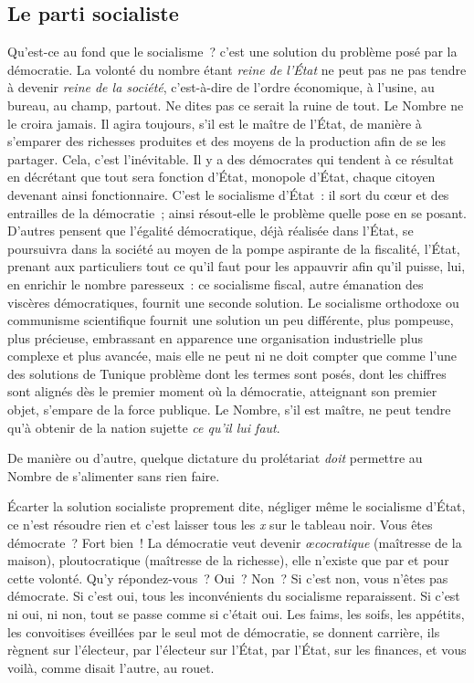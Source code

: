 \documentclass[french,twoside]{book} %
\begin{document}
\subsection[{Le parti socialiste}]{Le parti socialiste}
\noindent Qu’est-ce au fond que le socialisme ? c’est une solution du problème posé par la démocratie. La volonté du nombre étant \emph{reine de l’État} ne peut pas ne pas tendre à devenir \emph{reine de la société}, c’est-à-dire de l’ordre économique, à l’usine, au bureau, au champ, partout. Ne dites pas ce serait la ruine de tout. Le Nombre ne le croira jamais. Il agira toujours, s’il est le maître de l’État, de manière à s’emparer des richesses produites et des moyens de la production afin de se les partager. Cela, c’est l’inévitable. Il y a des démocrates qui tendent à ce résultat en décrétant que tout sera fonction d’État, monopole d’État, chaque citoyen devenant ainsi fonctionnaire. C’est le socialisme d’État : il sort du cœur et des entrailles de la démocratie ; ainsi résout-elle le problème quelle pose en se posant. D’autres pensent que l’égalité démocratique, déjà réalisée dans l’État, se poursuivra dans la société au moyen de la pompe aspirante de la fiscalité, l’État, prenant aux particuliers tout ce qu’il faut pour les appauvrir afin qu’il puisse, lui, en enrichir le nombre paresseux : ce socialisme fiscal, autre émanation des viscères démocratiques, fournit une seconde solution. Le socialisme orthodoxe ou communisme scientifique fournit une solution un peu différente, plus pompeuse, plus précieuse, embrassant en apparence une organisation industrielle plus complexe et plus avancée, mais elle ne peut ni ne doit compter que comme l’une des solutions de Tunique problème dont les termes sont posés, dont les chiffres sont alignés dès le premier moment où la démocratie, atteignant son premier objet, s’empare de la force publique. Le Nombre, s’il est maître, ne peut tendre qu’à obtenir de la nation sujette \emph{ce qu’il lui faut}.\par
De manière ou d’autre, quelque dictature du prolétariat \emph{doit} permettre au Nombre de s’alimenter sans rien faire.\par
Écarter la solution socialiste proprement dite, négliger même le socialisme d’État, ce n’est résoudre rien et c’est laisser tous les \emph{x} sur le tableau noir. Vous êtes démocrate ? Fort bien ! La démocratie veut devenir \emph{œcocratique} (maîtresse de la maison), ploutocratique (maîtresse de la richesse), elle n’existe que par et pour cette volonté. Qu’y répondez-vous ? Oui ? Non ? Si c’est non, vous n’êtes pas démocrate. Si c’est oui, tous les inconvénients du socialisme reparaissent. Si c’est ni oui, ni non, tout se passe comme si c’était oui. Les faims, les soifs, les appétits, les convoitises éveillées par le seul mot de démocratie, se donnent carrière, ils règnent sur l’électeur, par l’électeur sur l’État, par l’État, sur les finances, et vous voilà, comme disait l’autre, au rouet.\par
\end{document}
